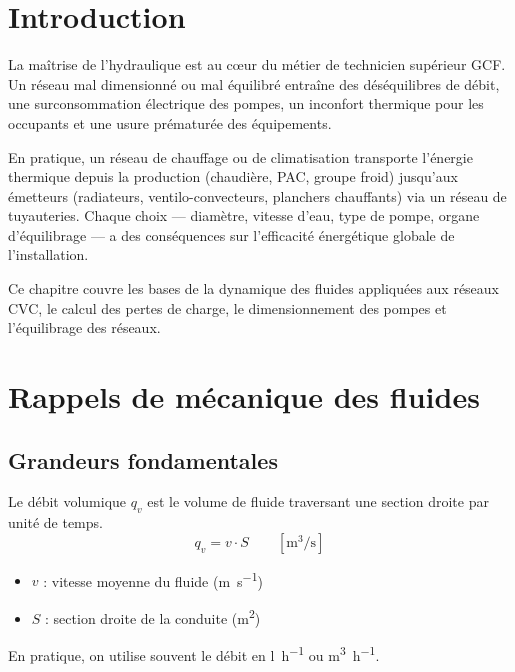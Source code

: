 \section{Introduction}

La maîtrise de l'hydraulique est au cœur du métier de technicien supérieur GCF. Un réseau mal dimensionné ou mal équilibré entraîne des déséquilibres de débit, une surconsommation électrique des pompes, un inconfort thermique pour les occupants et une usure prématurée des équipements.

En pratique, un réseau de chauffage ou de climatisation transporte l'énergie thermique depuis la production (chaudière, PAC, groupe froid) jusqu'aux émetteurs (radiateurs, ventilo-convecteurs, planchers chauffants) via un réseau de tuyauteries. Chaque choix — diamètre, vitesse d'eau, type de pompe, organe d'équilibrage — a des conséquences sur l'efficacité énergétique globale de l'installation.

Ce chapitre couvre les bases de la dynamique des fluides appliquées aux réseaux CVC, le calcul des pertes de charge, le dimensionnement des pompes et l'équilibrage des réseaux.

\section{Rappels de mécanique des fluides}

\subsection{Grandeurs fondamentales}

\begin{definition}[title=Débit volumique]
Le débit volumique $q_v$ est le volume de fluide traversant une section droite par unité de temps.
\begin{equation}
  q_v = v \cdot S \qquad \left[\si{\cubic\metre\per\second}\right]
\end{equation}
\begin{itemize}
  \item $v$ : vitesse moyenne du fluide (\si{\metre\per\second})
  \item $S$ : section droite de la conduite (\si{\square\metre})
\end{itemize}
En pratique, on utilise souvent le débit en \si{\litre\per\hour} ou \si{\cubic\metre\per\hour}.
\end{definition}

